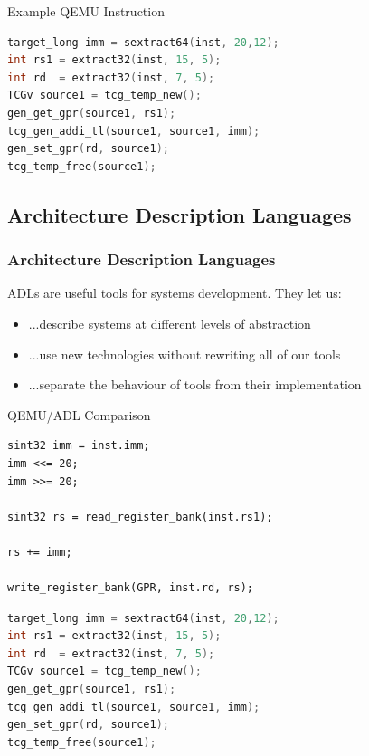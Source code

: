 \begin{frame}[fragile]{Example QEMU Instruction}
\begin{lstlisting}[language=C]
target_long imm = sextract64(inst, 20,12);
int rs1 = extract32(inst, 15, 5);
int rd  = extract32(inst, 7, 5);
TCGv source1 = tcg_temp_new();
gen_get_gpr(source1, rs1);
tcg_gen_addi_tl(source1, source1, imm);
gen_set_gpr(rd, source1);
tcg_temp_free(source1);
\end{lstlisting}
\end{frame}

\subsection{Architecture Description Languages}

\begin{frame}
\frametitle{Architecture Description Languages}

ADLs are useful tools for systems development. They let us:
\begin{itemize}
	\item<2-> ...describe systems at different levels of abstraction
	\item<3-> ...use new technologies without rewriting all of our tools
	\item<4-> ...separate the behaviour of tools from their implementation
\end{itemize}

\end{frame}

\begin{frame}[fragile]{QEMU/ADL Comparison}
    \begin{minipage}{0.47\textwidth}
        \begin{lstlisting}[basicstyle=\tt\tiny,frame=single]
sint32 imm = inst.imm;
imm <<= 20;
imm >>= 20;

sint32 rs = read_register_bank(inst.rs1);

rs += imm;

write_register_bank(GPR, inst.rd, rs);
    \end{lstlisting}
    \end{minipage} %
    \quad %
    \begin{minipage}{0.48\textwidth}
        \begin{lstlisting}[language=C,basicstyle=\tt\tiny,frame=single]
target_long imm = sextract64(inst, 20,12);
int rs1 = extract32(inst, 15, 5);
int rd  = extract32(inst, 7, 5);
TCGv source1 = tcg_temp_new();
gen_get_gpr(source1, rs1);
tcg_gen_addi_tl(source1, source1, imm);
gen_set_gpr(rd, source1);
tcg_temp_free(source1);
        \end{lstlisting}
    \end{minipage}
\end{frame}

